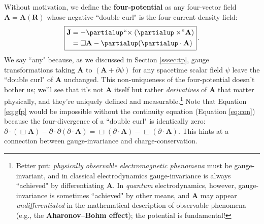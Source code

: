 \documentclass[12pt]{article}
\renewcommand{\vv}[1]{\mathbf{#1}}
\begin{document}
Without motivation, we define the \textbf{four-potential} as any four-vector field $\vv A = \vv A (\vv R)$ whose negative ``double curl" is the four-current density field:
\begin{equation}\label{eq:gfp}
\boxed{
\begin{split}
\vv J &= - \partialup \mkern1mu `` \mkern-4mu \times ( \partialup \times \mkern-4mu " \mkern1mu \vv A ) \\
&= \Box \vv A - \partialup ( \partialup \cdot \vv A)
\end{split}
} \, .
\end{equation}
We say ``any" because, as we discussed in Section \ref{sssec:tp}, gauge transformations taking $\vv A$ to $(\vv A + \partialup \psi)$ for any spacetime scalar field $\psi$ leave the ``double curl" of $\vv A$ unchanged. This non-uniqueness of the four-potential doesn't bother us; we'll see that it's not $\vv A$ itself but rather \emph{derivatives} of $\vv A$ that matter physically, and they're uniquely defined and measurable.\footnote{Better put: \emph{physically observable electromagnetic phenomena} must be gauge-invariant, and in classical electrodynamics gauge-invariance is always ``achieved" by differentiating $\vv A$. In \emph{quantum} electrodynamics, however, gauge-invariance is sometimes ``achieved" by other means, and $\vv A$ may appear \emph{undifferentiated} in the mathematical description of observable phenomena (e.g., the \textbf{Aharonov--Bohm effect}); the potential is fundamental!} Note that Equation \ref{eq:gfp} would be impossible without the continuity equation (Equation \ref{eq:con}) because the four-divergence of a ``double curl" is identically zero: ${\partialup \cdot (\Box \vv A) - \partialup \cdot \partialup (\partialup \cdot \vv A) = \Box (\partialup \cdot \vv A) - \Box (\partialup \cdot \vv A)}$. This hints at a connection between gauge-invariance and charge-conservation.
\end{document}
